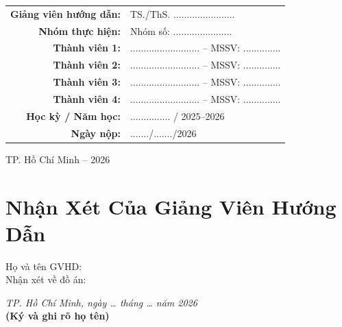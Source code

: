 \documentclass[12pt, a4paper]{report}
\begin{document}
\begin{titlepage}
    \begin{tabular}{rl}
        \textbf{Giảng viên hướng dẫn:} & TS./ThS. ....................... \\[0.3cm]
        \textbf{Nhóm thực hiện:}        & Nhóm số: ...................... \\[0.2cm]
        \textbf{Thành viên 1:}          & .......................... – MSSV: .............. \\[0.2cm]
        \textbf{Thành viên 2:}          & .......................... – MSSV: .............. \\[0.2cm]
        \textbf{Thành viên 3:}          & .......................... – MSSV: .............. \\[0.2cm]
        \textbf{Thành viên 4:}          & .......................... – MSSV: .............. \\[0.3cm]
        \textbf{Học kỳ / Năm học:}      & ............... / 2025--2026 \\[0.2cm]
        \textbf{Ngày nộp:}              & ......./......./2026 \\
    \end{tabular}

    \vfill
    {\large TP. Hồ Chí Minh – 2026}
\end{titlepage}

\newpage
\thispagestyle{plain}
\chapter*{Nhận Xét Của Giảng Viên Hướng Dẫn}

\vspace{1cm}

\noindent Họ và tên GVHD: \underline{\hspace{8cm}}\\[0.5cm]
\noindent Nhận xét về đồ án:

\vspace{7cm}

\begin{flushright}
    \textit{TP. Hồ Chí Minh, ngày \ldots{} tháng \ldots{} năm 2026}\\[1cm]
    \textbf{(Ký và ghi rõ họ tên)}\\[2cm]
    \underline{\hspace{6cm}}
\end{flushright}

\tableofcontents
\newpage
\end{document}
